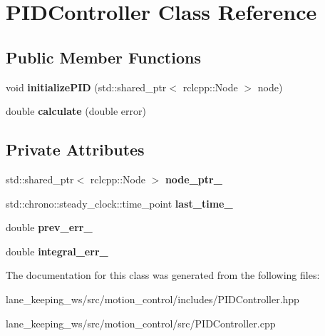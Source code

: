 \hypertarget{classPIDController}{}\section{P\+I\+D\+Controller Class Reference}
\label{classPIDController}
\subsection*{Public Member Functions}
\begin{DoxyCompactItemize}
\item 
\mbox{\label{classPIDController_a99c7174432cee9d439c21ba96cd2bb7c}} 
void {\bfseries initialize\+P\+ID} (std\+::shared\+\_\+ptr$<$ rclcpp\+::\+Node $>$ node)
\item 
\mbox{\label{classPIDController_ab23022125a42af26aae19d143c170799}} 
double {\bfseries calculate} (double error)
\end{DoxyCompactItemize}
\subsection*{Private Attributes}
\begin{DoxyCompactItemize}
\item 
\mbox{\label{classPIDController_a908d18d5013addda0f2434e37ad4f4f4}} 
std\+::shared\+\_\+ptr$<$ rclcpp\+::\+Node $>$ {\bfseries node\+\_\+ptr\+\_\+}
\item 
\mbox{\label{classPIDController_a750c8fddaed9240260d7ecb6a60dae90}} 
std\+::chrono\+::steady\+\_\+clock\+::time\+\_\+point {\bfseries last\+\_\+time\+\_\+}
\item 
\mbox{\label{classPIDController_a3437213676f1e86a363ef64c11d3bdb4}} 
double {\bfseries prev\+\_\+err\+\_\+}
\item 
\mbox{\label{classPIDController_a666ec341d63a0e8f4e6c06c5e9ff525b}} 
double {\bfseries integral\+\_\+err\+\_\+}
\end{DoxyCompactItemize}


The documentation for this class was generated from the following files\+:\begin{DoxyCompactItemize}
\item 
lane\+\_\+keeping\+\_\+ws/src/motion\+\_\+control/includes/P\+I\+D\+Controller.\+hpp\item 
lane\+\_\+keeping\+\_\+ws/src/motion\+\_\+control/src/P\+I\+D\+Controller.\+cpp\end{DoxyCompactItemize}
